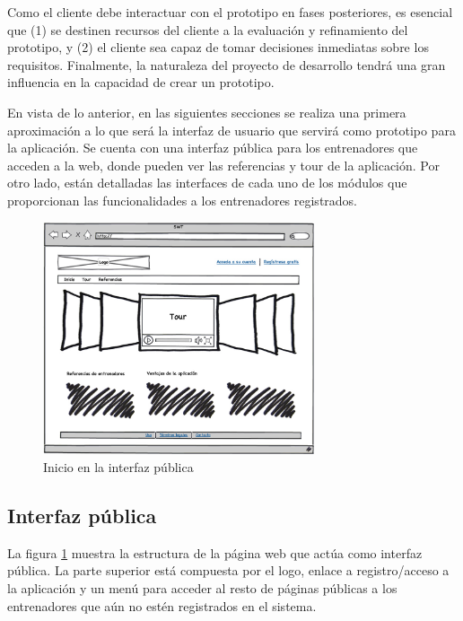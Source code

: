   		Como el cliente debe interactuar con el prototipo en fases posteriores, es esencial que (1) se destinen recursos del cliente a la evaluación y refinamiento del prototipo, y (2) el cliente sea capaz de tomar decisiones inmediatas sobre los requisitos. Finalmente, la naturaleza del proyecto de desarrollo tendrá una gran influencia en la capacidad de crear un prototipo.

  		En vista de lo anterior, en las siguientes secciones se realiza una primera aproximación a lo que será la interfaz de usuario que servirá como prototipo para la aplicación. Se cuenta con una interfaz pública para los entrenadores que acceden a la web, donde pueden ver las referencias y tour de la aplicación. Por otro lado, están detalladas las interfaces de cada uno de los módulos que proporcionan las funcionalidades a los entrenadores registrados.

  	\begin{figure}[H]
  	  \centering
  	    \includegraphics[width=8cm]{./eps/p_interfaz/1_Inicio.eps}
  	  \caption{Inicio en la interfaz pública}
  	  \label{fig:interfaz_publica_inicio}
  	\end{figure}


  	\subsection{Interfaz pública} %
  		\label{sub:interfaz_publica}

  		La figura \ref{fig:interfaz_publica_inicio} muestra la estructura de la página web que actúa como interfaz pública. La parte superior está compuesta por el logo, enlace a registro/acceso a la aplicación y un menú para acceder al resto de páginas públicas a los entrenadores que aún no estén registrados en el sistema.


